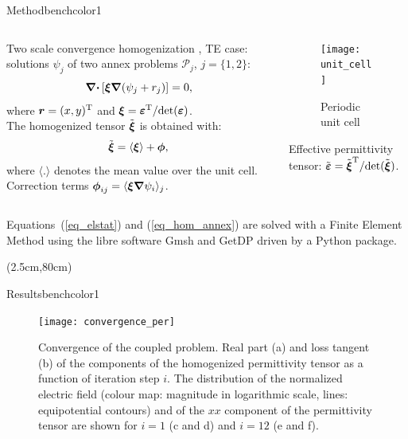 \documentclass[final,12pt]{beamer} %
\begin{document}
\begin{frame}
\begin{textblock*}{38.5cm}
\begin{posterblock}{Method}{benchcolor1}
\begin{columns}[t,totalwidth=\columnwidth]
\begin{column}{.64\columnwidth}
  Two scale convergence homogenization \cite{allaire_homogenization_1992, guenneau_homogenization_2000}, TE case:
  solutions $\psi_j$ of two annex problems $\mathcal P_j$, $j=\{1, 2\}$:
  \begin{equation}
   \boldsymbol{\mathrm{\nabla\cdotp}} \left[ \boldsymbol{\xi} \boldsymbol{\mathrm{\nabla}}(\psi_j + r_j) \right] = 0,
   \label{eq_hom_annex}
  \end{equation}
  where $\boldsymbol r = (x, y)^{\rm T}$ and $\boldsymbol{\xi}=\boldsymbol{\varepsilon}^{\rm T}/ {\rm det }(\boldsymbol{\varepsilon})$.\\
  The homogenized tensor $\tilde{\boldsymbol{\xi}}$ is obtained with:
  \begin{equation}
   \tilde{\boldsymbol{\xi}} = \langle \boldsymbol{\xi} \rangle + \boldsymbol \phi,
   \label{eq_hom}
  \end{equation}
  where $\langle . \rangle$ denotes the mean value over the unit cell.
  Correction terms $\boldsymbol \phi_{ij} = \langle \boldsymbol{\xi} \boldsymbol{\mathrm{\nabla}} \psi_i \rangle_j$.\\
\end{column}

\begin{column}{.3\columnwidth}

  \begin{figure}[!t]
   \centering
   \texttt{[image: unit\_cell]}
   \caption{Periodic unit cell}
   \label{fig_cell}
  \end{figure}

  Effective permittivity tensor: $\tilde{\boldsymbol{\varepsilon}}=\tilde{\boldsymbol{\xi}}^{\rm T}/ {\rm det }(\tilde{\boldsymbol{\xi}})$.



\end{column}
\end{columns}




Equations~(\ref{eq_elstat}) and (\ref{eq_hom_annex}) are solved with a Finite Element
Method using the libre software Gmsh \cite{geuzaine_gmsh_2009} and GetDP \cite{dular_general_1998} driven by a Python package.

\end{posterblock}
\end{textblock*}
%
%
\begin{textblock*}{38.5cm}(2.5cm,80cm)
\begin{posterblock}{Results}{benchcolor1}
 \begin{figure}[!t]
   \centering
   \texttt{[image: convergence\_per]}
   \caption{Convergence of the coupled problem.
    Real part (a) and loss tangent (b) of the components of the homogenized
    permittivity tensor as a function of iteration step $i$. The distribution of
    the normalized electric field (colour map: magnitude in logarithmic scale,
    lines: equipotential contours) and of the
    $xx$ component of the permittivity tensor are shown for $i=1$
    (c and d) and $i=12$ (e and f).
   }
   \label{conv2D}
 \end{figure}
\end{posterblock}


\end{textblock*}
\end{frame}
\end{document}
